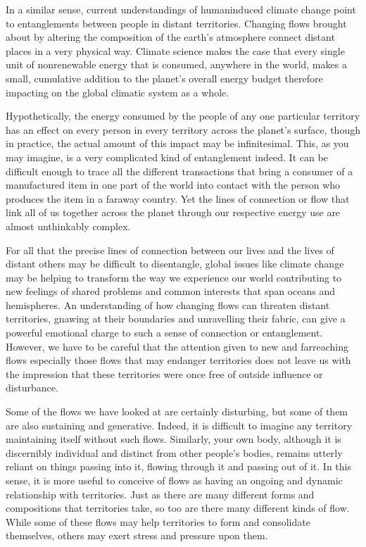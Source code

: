 \documentclass[letterpaper,10pt,english]{sphinxmanual}
\begin{document}
In a similar sense, current understandings of human\sphinxhyphen{}induced climate change point to entanglements between people in distant territories. Changing flows brought about by altering the composition of the earth’s atmosphere connect distant places in a very physical way. Climate science makes the case that every single unit of non\sphinxhyphen{}renewable energy that is consumed, anywhere in the world, makes a small, cumulative addition to the planet’s overall energy budget \textendash{} therefore impacting on the global
climatic system as a whole.

Hypothetically, the energy consumed by the people of any one particular territory has an effect on every person in every territory across the planet’s surface, though in practice, the actual amount of this impact may be infinitesimal. This, as you may imagine, is a very complicated kind of entanglement indeed. It can be difficult enough to trace all the different transactions that bring a consumer of a manufactured item in one part of the world into contact with the person who produces the item
in a faraway country. Yet the lines of connection or flow that link all of us together across the planet through our respective energy use are almost unthinkably complex.

For all that the precise lines of connection between our lives and the lives of distant others may be difficult to disentangle, global issues like climate change may be helping to transform the way we experience our world \textendash{} contributing to new feelings of shared problems and common interests that span oceans and hemispheres. An understanding of how changing flows can threaten distant territories, gnawing at their boundaries and unravelling their fabric, can give a powerful emotional charge to
such a sense of connection or entanglement. However, we have to be careful that the attention given to new and far\sphinxhyphen{}reaching flows \textendash{} especially those flows that may endanger territories \textendash{} does not leave us with the impression that these territories were once free of outside influence or disturbance.

Some of the flows we have looked at are certainly disturbing, but some of them are also sustaining and generative. Indeed, it is difficult to imagine any territory maintaining itself without such flows. Similarly, your own body, although it is discernibly individual and distinct from other people’s bodies, remains utterly reliant on things passing into it, flowing through it and passing out of it. In this sense, it is more useful to conceive of flows as having an ongoing and dynamic relationship
with territories. Just as there are many different forms and compositions that territories take, so too are there many different kinds of flow. While some of these flows may help territories to form and consolidate themselves, others may exert stress and pressure upon them.
\end{document}

